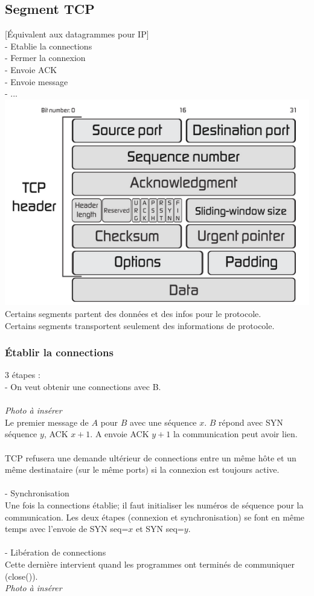 \documentclass{article}
\begin{document}
\subsection{Segment TCP}
[Équivalent aux datagrammes pour IP] \\
- Etablie la connections \\ 
- Fermer la connexion \\
- Envoie ACK \\
- Envoie message \\
- ... \\
\includegraphics{image/tcp.png} \\
\newpage
Certains segments partent des données et des infos pour le protocole. \\
Certains segments transportent seulement des informations de protocole. \\
\subsubsection{Établir la connections}
3 étapes : \\
- On veut obtenir une connections avec B.\\
\\ \emph{Photo à insérer} \\
Le premier message de $A$ pour $B$ avec une séquence $x$. $B$ répond avec SYN séquence $y$, ACK $x+1$. A envoie ACK $y+1$ la communication peut avoir lien. \\
\\
TCP refusera une demande ultérieur de connections entre un même hôte et un même destinataire (sur le même ports) si la connexion est toujours active. \\
\\
- Synchronisation \\
Une fois la connections établie; il faut initialiser les numéros de séquence pour la communication. Les deux étapes (connexion et synchronisation) se font en même temps avec l'envoie de SYN seq=$x$ et SYN seq=$y$. \\
\\
- Libération de connections \\
Cette dernière intervient quand les programmes ont terminés de communiquer (close()). \\
\emph{Photo à insérer} \\
\end{document}
